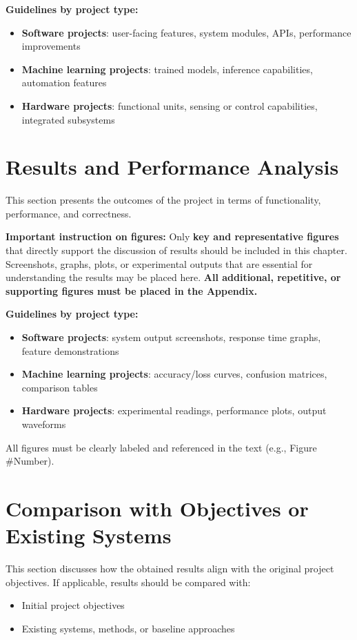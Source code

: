 \textbf{Guidelines by project type:}
\begin{itemize}
    \item \textbf{Software projects}: user-facing features, system modules, APIs, performance improvements
    \item \textbf{Machine learning projects}: trained models, inference capabilities, automation features
    \item \textbf{Hardware projects}: functional units, sensing or control capabilities, integrated subsystems
\end{itemize}

\section{Results and Performance Analysis}
This section presents the outcomes of the project in terms of functionality, performance, and correctness.

\textbf{Important instruction on figures:}  
Only \textbf{key and representative figures} that directly support the discussion of results should be included in this chapter. Screenshots, graphs, plots, or experimental outputs that are essential for understanding the results may be placed here.  
\textbf{All additional, repetitive, or supporting figures must be placed in the Appendix.}

\textbf{Guidelines by project type:}
\begin{itemize}
    \item \textbf{Software projects}: system output screenshots, response time graphs, feature demonstrations
    \item \textbf{Machine learning projects}: accuracy/loss curves, confusion matrices, comparison tables
    \item \textbf{Hardware projects}: experimental readings, performance plots, output waveforms
\end{itemize}

All figures must be clearly labeled and referenced in the text (e.g., Figure \#Number).

\section{Comparison with Objectives or Existing Systems}
This section discusses how the obtained results align with the original project objectives. If applicable, results should be compared with:
\begin{itemize}
    \item Initial project objectives
    \item Existing systems, methods, or baseline approaches
\end{itemize}

